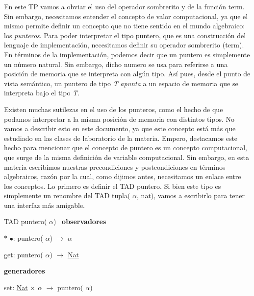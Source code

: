En este TP vamos a obviar el uso del operador sombrerito y de la función term. Sin embargo, necesitamos entender el concepto de valor computacional, ya que el mismo permite definir un concepto que no tiene sentido en el mundo algebraico\+: los {\itshape punteros}. Para poder interpretar el tipo puntero, que es una construcción del lenguaje de implementación, necesitamos definir su operador sombrerito (term). En términos de la implementación, podemos decir que un puntero es simplemente un número natural. Sin embargo, dicho numero se usa para referirse a una posición de memoria que se interpreta con algún tipo. Así pues, desde el punto de vista semántico, un puntero de tipo {\itshape T} {\itshape apunta} a un espacio de memoria que se interpreta bajo el tipo {\itshape T}.

Existen muchas sutilezas en el uso de los punteros, como el hecho de que podamos interpretar a la misma posición de memoria con distintos tipos. No vamos a describir esto en este documento, ya que este concepto está más que estudiado en las clases de laboratorio de la materia. Empero, destacamos este hecho para mencionar que el concepto de puntero es un concepto computacional, que surge de la misma definición de variable computacional. Sin embargo, en esta materia escribimos nuestras precondiciones y postcondiciones en términos algebraicos, razón por la cual, como dijimos antes, necesitamos un enlace entre los conceptos. Lo primero es definir el T\+AD puntero. Si bien este tipo es simplemente un renombre del T\+AD tupla( $\alpha$, nat), vamos a escribirlo para tener una interfaz más amigable.

T\+AD puntero( $\alpha$)~\newline
{\bfseries observadores} ~\newline

\begin{DoxyItemize}
\item $\ast$ $\bullet$\+: puntero( $\alpha$) $\to$ $\alpha$~\newline

\item get\+: puntero( $\alpha$) $\to$ \hyperlink{classNat}{Nat}
\end{DoxyItemize}

{\bfseries generadores} ~\newline

\begin{DoxyItemize}
\item set\+: \hyperlink{classNat}{Nat} $\times$ $\alpha$ $\to$ puntero( $\alpha$)
\end{DoxyItemize}

